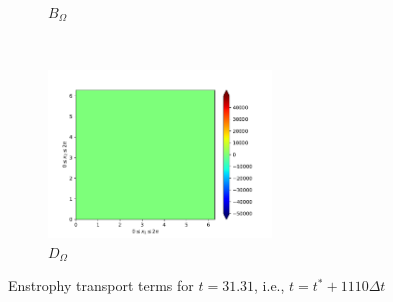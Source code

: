 \begin{figure}[H]
\begin{subfigure}{0.45\textwidth}
        \caption{$B_{\Omega}$}
    \end{subfigure}
    ~
    \begin{subfigure}{0.45\textwidth}
        \includegraphics[height=1.75in]{media/run-cds-65-25k/D-enst-449.png}
        \caption{$D_{\Omega}$}
    \end{subfigure}
    \caption{Enstrophy transport terms for $t=31.31$, i.e., $t=t^{\ast} + 1110 \Delta t$}
\end{figure}

\newpage

